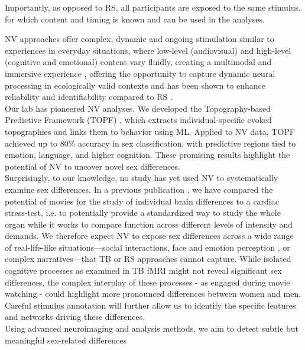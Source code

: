 \documentclass[11pt,a4paper]{article}
\begin{document}
Importantly, as opposed to RS, all participants are exposed to the same stimulus, 
for which content and timing 
is known and can be used in the analyses.
\par\vspace{-1\parskip}\noindent
NV approaches offer complex, dynamic and ongoing stimulation similar 
to experiences in everyday situations, where low-level (audiovisual) and high-level (cognitive and emotional) 
content vary fluidly, creating a multimodal and immersive experience 
\parencite{sonkusareNaturalisticStimuliNeuroscience2019}, offering the 
opportunity to capture dynamic neural processing in ecologically valid contexts 
\parencite{vanderwalMoviesMagnetNaturalistic2019} and has been shown to enhance reliability and 
identifiability compared to RS \parencite{krollNaturalisticViewingIncreases2023}.\\
Our lab has pioneered NV analyses. We developed the Topography-based Predictive Framework (TOPF) 
\parencite{liTopographybasedPredictiveFramework2023a}, which extracts individual-specific evoked 
topographies and links them to behavior using ML. 
Applied to NV data, TOPF achieved up to 80\% accuracy in 
sex classification, with predictive regions tied to emotion, language, and higher cognition. 
These promising results highlight the potential of NV to uncover novel sex differences.\\
Surprisingly, to our knowledge, no study has yet used NV to systematically examine sex differences. 
In a previous publication \parencite{eickhoffClinicalApplicationsMovie2020a}, we have compared the potential of 
movies for the study of 
individual brain differences to a cardiac stress-test, 
i.e. to potentially provide a standardized way to study the whole organ while it works to compare function 
across different levels of intensity and demands. 
We therefore expect NV to expose sex differences across a wide range of real-life-like situations—social interactions, 
face and emotion perception \parencite{sonkusareNaturalisticStimuliNeuroscience2019}, 
or complex narratives—that TB or RS approaches cannot capture. 
While isolated cognitive processes as examined in TB fMRI might not reveal 
significant sex differences, the complex interplay of these processes - as engaged during movie watching - could 
highlight more pronounced differences between women and men. 
Careful stimulus annotation will further allow us to identify the specific features and networks driving these differences.\\
Using advanced neuroimaging and analysis methods, we aim to detect subtle but meaningful sex-related differences 
\end{document}
